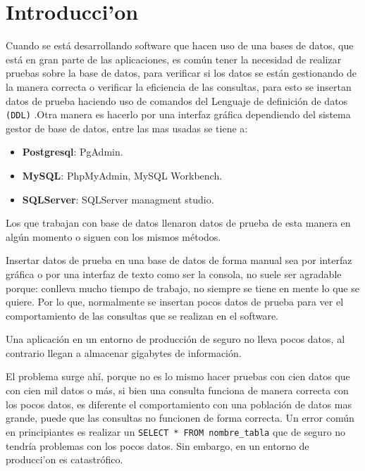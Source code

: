 
\chapter{Introducci'on}
\renewcommand{\footrulewidth}{0.4pt}%
\pagestyle{plain}

Cuando se est\'a desarrollando software que hacen  uso de una bases de datos, que est\'a en gran parte de las aplicaciones, es com\'un tener la necesidad de realizar pruebas sobre la base de datos, para verificar si los datos se est\'an gestionando de la manera correcta o verificar la eficiencia  de las consultas, para esto se insertan datos de prueba haciendo uso de comandos del Lenguaje de definici\'on de datos \texttt{(DDL)} \cite{ddl}.Otra manera es hacerlo por una interfaz gr\'afica dependiendo del sistema gestor de base de datos, entre las mas usadas se tiene a:
\begin{itemize}
\item \textbf{Postgresql}: PgAdmin.
\item \textbf{MySQL}: PhpMyAdmin, MySQL Workbench.
\item \textbf{SQLServer}: SQLServer managment studio.
\end{itemize}
Los que trabajan con base de datos llenaron datos de prueba de esta manera en alg\'un momento o siguen con los mismos m\'etodos.

Insertar datos de prueba en una base de datos de forma manual sea por interfaz gr\'afica o por una interfaz de texto como ser la consola, no suele ser agradable porque: conlleva mucho tiempo de trabajo, no siempre se tiene en mente lo que se quiere. Por lo que, normalmente se insertan pocos datos de prueba para ver el comportamiento de las consultas que se realizan en el software. 

Una aplicaci\'on en un entorno de producci\'on de seguro no lleva pocos datos, al contrario llegan a almacenar gigabytes de informaci\'on.

El problema surge ah\'i, porque no es lo mismo hacer pruebas con cien datos que con cien mil datos o m\'as, si bien una consulta funciona de manera correcta con los pocos datos, es diferente el comportamiento con una poblaci\'on de datos mas grande, puede que las consultas no funcionen de forma correcta. Un error com\'un en principiantes es realizar un \texttt{SELECT * FROM nombre\_tabla} que de seguro no tendr\'ia problemas con los pocos datos. Sin embargo, en un entorno de producci'on es catastr\'ofico. 

